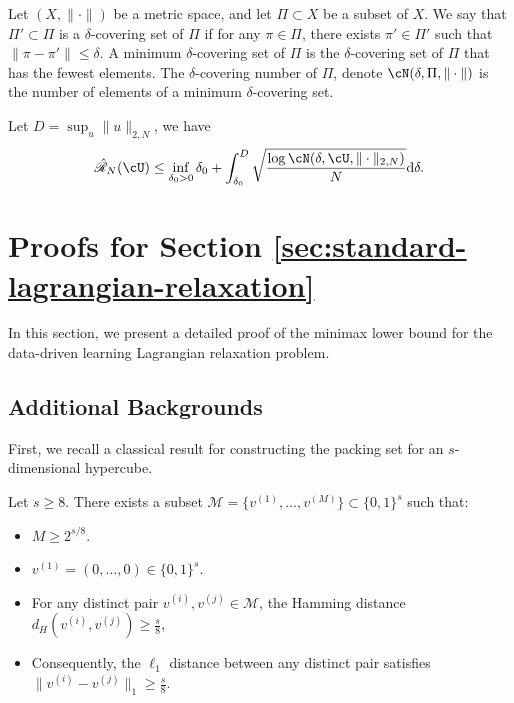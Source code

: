 \begin{definition}
    Let $(X, \|\cdot\|)$ be a metric space, and let $\Pi \subset X$ be a subset of $X$. We say that $\Pi' \subset \Pi$ is a $\delta$-covering set of $\Pi$ if for any $\pi \in \Pi$, there exists $\pi' \in \Pi'$ such that $\|\pi - \pi'\| \leq \delta$. A minimum $\delta$-covering set of $\Pi$ is the $\delta$-covering set of $\Pi$ that has the fewest elements. The $\delta$-covering number of $\Pi$, denote $\cN(\delta, \Pi, \|\cdot\|)$ is the number of elements of a minimum $\delta$-covering set. 
\end{definition}

\begin{lemma} \label{lm:dudley} Let $D = \sup_{u}\|u\|_{2, N}$, we have
    \[
    \hat{\mathscr{R}}_N(\cU) \leq \inf_{\delta_0 > 0} \delta_0 + \int_{\delta_0}^{D} \sqrt{\frac{\log \cN(\delta, \cU, \|\cdot\|_{2, N})}{N}} \mathrm{d}\delta.
    \]
\end{lemma}


\section{Proofs for Section \ref{sec:standard-lagrangian-relaxation}} \label{apx:standard-lagrangian-relaxation}

In this section, we present a detailed proof of the minimax lower bound for the data-driven learning Lagrangian relaxation problem.

\subsection{Additional Backgrounds}


First, we recall a classical result for constructing the packing set for an $s$-dimensional hypercube.

\begin{lemma} \label{lm:Varshamov-Gilbert-bound}
    Let $s \geq 8$. There exists a subset $\mathcal{M} = \{v^{(1)}, \dots, v^{(M)}\} \subset \{0, 1\}^s$ such that:
    \begin{itemize}
        \item $M \geq 2^{s / 8}$.
        \item $v^{(1)} = (0, \dots, 0) \in \{0, 1\}^s$.
        \item For any distinct pair $v^{(i)}, v^{(j)} \in \mathcal{M}$, the Hamming distance $d_H(v^{(i)}, v^{(j)}) \geq \frac{s}{8}$,
        \item Consequently, the $\ell_1$ distance between any distinct pair satisfies $\|v^{(i)} - v^{(j)}\|_1 \geq \frac{s}{8}$.
    \end{itemize}
\end{lemma}

